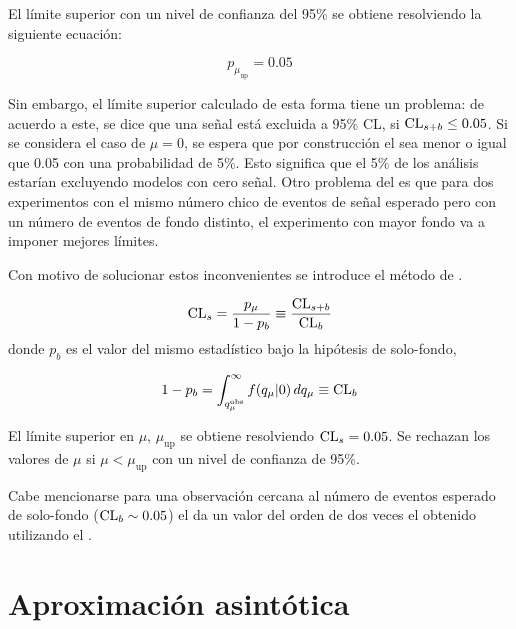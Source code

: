 El límite superior con un nivel de
confianza del 95\% se obtiene resolviendo la siguiente ecuación:

\begin{equation}
  p_{\mu_\text{up}} = 0.05
\end{equation}

Sin embargo, el límite superior calculado de esta forma tiene un problema: de
acuerdo a este, se dice que una señal está excluida a 95\% CL, si ${\mathrm{CL}_{s+b}} \leq
0.05$. Si se considera el caso de $\mu=0$, se espera que por construcción el
{\clsb} sea menor o igual que 0.05 con una probabilidad de 5\%. Esto significa
que el 5\% de los análisis estarían excluyendo modelos con cero señal. Otro
problema del {\clsb} es que para dos experimentos con el mismo número chico de
eventos de señal esperado pero con un número de eventos de fondo distinto, el
experimento con mayor fondo va a imponer mejores límites.

Con motivo de solucionar estos inconvenientes se introduce el método de {\cls}\cite{ReadCLs}.


\begin{equation}
  \mathrm{CL}_s = \frac{p_\mu}{1-p_b}  \equiv \frac{\mathrm{CL}_{s+b}}{\mathrm{CL}_b}
\end{equation}
%
donde $p_b$ es el valor del mismo estadístico bajo la hipótesis de solo-fondo,

\begin{equation}
  1 - p_b = \int_{q_\mu^\text{obs}}^{\infty}
  f({q}_\mu|0) \, dq_\mu \equiv \mathrm{CL}_b
\end{equation}

El límite superior {\cls} en $\mu$, $\mu_\text{up}$ se obtiene resolviendo
$\mathrm{CL}_s = 0.05$. Se rechazan los valores de $\mu$ si $\mu <
\mu_\text{up}$ con un nivel de confianza de 95\%.

Cabe mencionarse para una observación cercana al número de eventos esperado de solo-fondo ($\mathrm{CL}_b
\sim 0.05$) el {\cls} da un valor del orden de dos veces el obtenido utilizando
el {\clsb}.


\section{Aproximación asintótica}\label{sec:aprox}

